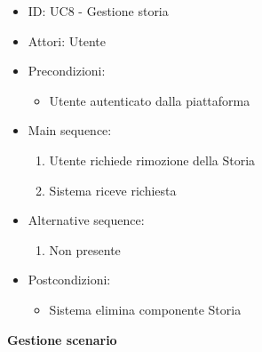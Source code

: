 \documentclass{article}
\begin{document}
\begin{itemize}[label = { }]
    \itemsep0px
    \item ID: UC8 - Gestione storia
    \item Attori: Utente
    \item Precondizioni: 
        \begin{itemize}[label = {-}]
            \item Utente autenticato dalla piattaforma
        \end{itemize}
    \item Main sequence: 
        \begin{enumerate}
            \item Utente richiede rimozione della Storia
            \item Sistema riceve richiesta
        \end{enumerate}
    \item Alternative sequence:
        \begin{enumerate}
            \item Non presente
        \end{enumerate}
    \item Postcondizioni: 
        \begin{itemize}[label = {-}]
            \item Sistema elimina componente Storia
        \end{itemize}
\end{itemize}
\textbf{Gestione scenario}
\end{document}
